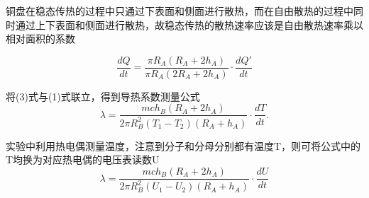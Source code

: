 \documentclass{article}
\begin{document}
铜盘在稳态传热的过程中只通过下表面和侧面进行散热，而在自由散热的过程中同时通过上下表面和侧面进行散热，故稳态传热的散热速率应该是自由散热速率乘以相对面积的系数

\begin{equation}
		 \dfrac{dQ}{dt}=\dfrac{\pi R_A(R_A+2h_A)}{\pi R_A(2R_A+2h_A)}\cdot\dfrac{dQ'}{dt} 
\end{equation}


将(3)式与(1)式联立，得到导热系数测量公式
\begin{equation}
	\lambda=\dfrac{mch_B(R_A+2h_A)}{2\pi R_B^2(T_1-T_2)(R_A+h_A)}\cdot \dfrac{dT}{dt}.
\end{equation}


实验中利用热电偶测量温度，注意到分子和分母分别都有温度T，则可将公式中的T均换为对应热电偶的电压表读数U
\begin{equation}
		\lambda=\dfrac{mch_B(R_A+2h_A)}{2\pi R_B^2(U_1-U_2)(R_A+h_A)}\cdot \dfrac{dU}{dt} 
\end{equation}
\end{document}
